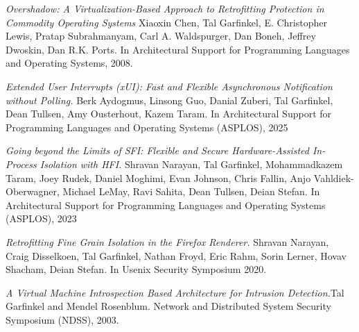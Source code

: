 \begin{resume}
\pagebreak

{\it Overshadow: A Virtualization-Based Approach to Retrofitting
Protection in Commodity Operating Systems} Xiaoxin Chen, Tal
Garfinkel, E. Christopher Lewis, Pratap Subrahmanyam, Carl A.
Waldspurger, Dan Boneh, Jeffrey Dwoskin, Dan R.K. Ports.
In Architectural Support for Programming Languages and Operating
Systems, 2008.

{\em Extended User Interrupts (xUI): Fast and Flexible Asynchronous
Notification without Polling.} Berk Aydogmus, Linsong Guo, Danial Zuberi, Tal
Garfinkel, Dean Tullsen, Amy Ousterhout, Kazem Taram.  In Architectural Support
for Programming Languages and Operating Systems (ASPLOS), 2025

{\em Going beyond the Limits of SFI: Flexible and Secure Hardware-Assisted
In-Process Isolation with HFI.} Shravan Narayan, Tal Garfinkel, Mohammadkazem
Taram, Joey Rudek, Daniel Moghimi, Evan Johnson, Chris Fallin, Anjo Vahldiek-Oberwagner, Michael LeMay, Ravi Sahita, Dean Tullsen, Deian Stefan.  In
Architectural Support for Programming Languages and Operating Systems (ASPLOS),
2023


{\em Retrofitting Fine Grain Isolation in the Firefox Renderer.} Shravan
Narayan, Craig Disselkoen, Tal Garfinkel, \newline Nathan Froyd, Eric Rahm, Sorin
Lerner, Hovav Shacham, Deian Stefan. In Usenix Security Symposium 2020.

{\it A Virtual Machine Introspection Based Architecture for Intrusion
Detection.}\newline Tal Garfinkel and Mendel Rosenblum. Network and
Distributed System Security Symposium (NDSS), 2003.




\end{resume}
